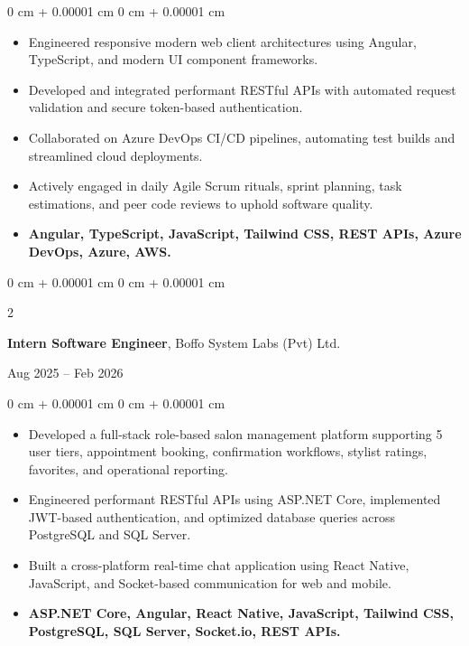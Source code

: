 \documentclass[10pt, letterpaper]{article}
\newenvironment{highlights}{
    \begin{itemize}[
        topsep=0.08 cm,
        parsep=0.08 cm,
        partopsep=0pt,
        itemsep=0pt,
        leftmargin=0 cm + 10pt
    ]
}{
    \end{itemize}
} %
\newenvironment{onecolentry}{
    \begin{adjustwidth}{
        0 cm + 0.00001 cm
    }{
        0 cm + 0.00001 cm
    }
}{
    \end{adjustwidth}
} %
\newenvironment{twocolentry}[2][]{
    \onecolentry
    \def\secondColumn{#2}
    \setcolumnwidth{\fill, 4.5 cm}
    \begin{paracol}{2}
}{
    \switchcolumn \raggedleft \secondColumn
    \end{paracol}
    \endonecolentry
} %
\begin{document}
        \vspace{0.10 cm}
        \begin{onecolentry}
            \begin{highlights}
            \item Engineered responsive modern web client architectures using Angular, TypeScript, and modern UI component frameworks.
            \item Developed and integrated performant RESTful APIs with automated request validation and secure token-based authentication.
            \item Collaborated on Azure DevOps CI/CD pipelines, automating test builds and streamlined cloud deployments.
            \item Actively engaged in daily Agile Scrum rituals, sprint planning, task estimations, and peer code reviews to uphold software quality.
            \item \textbf{Angular, TypeScript, JavaScript, Tailwind CSS, REST APIs, Azure DevOps, Azure, AWS.}
            \end{highlights}
        \end{onecolentry}

        \vspace{0.15 cm}
    \begin{twocolentry}{
            Aug 2025 – Feb 2026
        }
            \textbf{Intern Software Engineer}, Boffo System Labs (Pvt) Ltd.
    \end{twocolentry}

        \vspace{0.10 cm}
        \begin{onecolentry}
            \begin{highlights}
            \item Developed a full-stack role-based salon management platform supporting 5 user tiers, appointment booking, confirmation workflows, stylist ratings, favorites, and operational reporting.
            \item Engineered performant RESTful APIs using ASP.NET Core, implemented JWT-based authentication, and optimized database queries across PostgreSQL and SQL Server.
            \item Built a cross-platform real-time chat application using React Native, JavaScript, and Socket-based communication for web and mobile.
            \item \textbf{ASP.NET Core, Angular, React Native, JavaScript, Tailwind CSS, PostgreSQL, SQL Server, Socket.io, REST APIs.}
            \end{highlights}
        \end{onecolentry}
\end{document}
